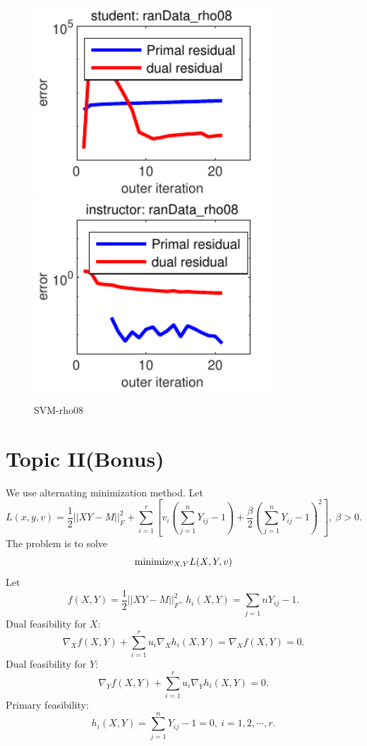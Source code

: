 \documentclass[12pt]{article}
\begin{document}
\begin{figure}\caption{SVM-rho08}
\begin{center}
\includegraphics[width=0.8\textwidth]{student_rho08.pdf} 
\includegraphics[width=0.8\textwidth]{instructor_rho08.pdf} 
\end{center}
\end{figure}

\newpage
\section*{Topic II(Bonus)}

We use alternating minimization method. Let
$$
L(x,y,v)=\frac{1}{2}||XY-M||_{F}^2+\sum\limits_{i=1}^{r}[v_i(\sum\limits_{j=1}^{n}Y_{ij}-1)+\frac{\beta}{2}(\sum\limits_{j=1}^{n}Y_{ij}-1)^2], \ \beta>0.
$$
The problem is to solve
$$
{\rm minimize}_{X,Y}L(X,Y,v)
$$
Let
$$
f(X,Y)=\frac{1}{2}||XY-M||_{F}^2, \ h_i(X,Y)=\sum\limits_{j=1}{n}Y_{ij}-1.
$$
Dual feasibility for $X$:
$$
\nabla_Xf(X,Y)+\sum\limits_{i=1}^{r}u_i\nabla_Xh_i(X,Y)=\nabla_Xf(X,Y)=0.
$$
Dual feasibility for $Y$:
$$
\nabla_Y f(X,Y)+\sum\limits_{i=1}^ru_i\nabla_Yh_i(X,Y)=0.
$$
Primary feasibility:
$$
 h_i(X,Y)=\sum\limits_{j=1}^{n}Y_{ij}-1=0, \ i=1,2,\cdots,r.
$$
\end{document}

